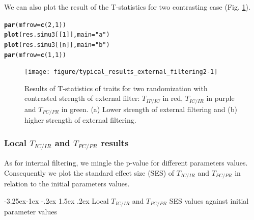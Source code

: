 \documentclass[12pt]{article}\usepackage[]{graphicx}\usepackage[]{color}
\makeatletter
\newcommand{\hlnum}[1]{\textcolor[rgb]{0.686,0.059,0.569}{#1}}%
\newcommand{\hlstr}[1]{\textcolor[rgb]{0.192,0.494,0.8}{#1}}%
\newcommand{\hlstd}[1]{\textcolor[rgb]{0.345,0.345,0.345}{#1}}%
\newcommand{\hlkwc}[1]{\textcolor[rgb]{0.333,0.667,0.333}{#1}}%
\newcommand{\hlkwd}[1]{\textcolor[rgb]{0.737,0.353,0.396}{\textbf{#1}}}%
\newenvironment{kframe}{%
 \def\at@end@of@kframe{}%
 \ifinner\ifhmode%
  \def\at@end@of@kframe{\end{minipage}}%
  \begin{minipage}{\columnwidth}%
 \fi\fi%
 \def\FrameCommand##1{\hskip\@totalleftmargin \hskip-\fboxsep
 \colorbox{shadecolor}{##1}\hskip-\fboxsep
     \hskip-\linewidth \hskip-\@totalleftmargin \hskip\columnwidth}%
 \MakeFramed {\advance\hsize-\width
   \@totalleftmargin\z@ \linewidth\hsize
   \@setminipage}}%
 {\par\unskip\endMakeFramed%
 \at@end@of@kframe}
\newenvironment{knitrout}{}{} %
\newcounter {subsubsubsection}[subsubsection]
\newcommand\subsubsubsection{\@startsection{subsubsubsection}{4}{\z@}%
          {-3.25ex\@plus -1ex \@minus -.2ex}%
          {1.5ex \@plus .2ex}%
          {\normalfont\normalsize\bfseries}}
\makeatother
\begin{document}
We can also plot the result of the T-statistics for two contrasting case (Fig. \ref{fig:typical_results_external_filtering2}).

\begin{knitrout}\small
{}\color{fgcolor}\begin{kframe}
\begin{alltt}
\hlkwd{par}\hlstd{(}\hlkwc{mfrow}\hlstd{=}\hlkwd{c}\hlstd{(}\hlnum{2}\hlstd{,} \hlnum{1}\hlstd{))}
\hlkwd{plot}\hlstd{(res.simu3[[}\hlnum{1}\hlstd{]],} \hlkwc{main} \hlstd{=} \hlstr{"a"}\hlstd{)}
\hlkwd{plot}\hlstd{(res.simu3[[n]],} \hlkwc{main} \hlstd{=} \hlstr{"b"}\hlstd{)}
\hlkwd{par}\hlstd{(}\hlkwc{mfrow}\hlstd{=}\hlkwd{c}\hlstd{(}\hlnum{1}\hlstd{,} \hlnum{1}\hlstd{))}
\end{alltt}
\end{kframe}\begin{figure}

{\centering \texttt{[image: figure/typical\_results\_external\_filtering2-1]} 

}

\caption[Results of T-statistics of traits for two randomization with contrasted strength of external filter]{Results of T-statistics of traits for two randomization with contrasted strength of external filter: $T_{IP/IC}$ in red, $T_{IC/IR}$ in purple and $T_{PC/PR}$ in green. (a) Lower strength of external filtering and (b) higher strength of external filtering.\label{fig:typical_results_external_filtering2}}
\end{figure}


\end{knitrout}

 \subsubsection {Local $T_{IC/IR}$ and $T_{PC/PR}$ results}

As for internal filtering, we mingle the p-value for different parameters values. Consequently we plot the standard effect size (SES) of $T_{IC/IR}$ and $T_{PC/PR}$ in relation to the initial parameters values. 

  \subsubsubsection {Local $T_{IC/IR}$ and $T_{PC/PR}$ SES values against initial parameter values}
\end{document}

